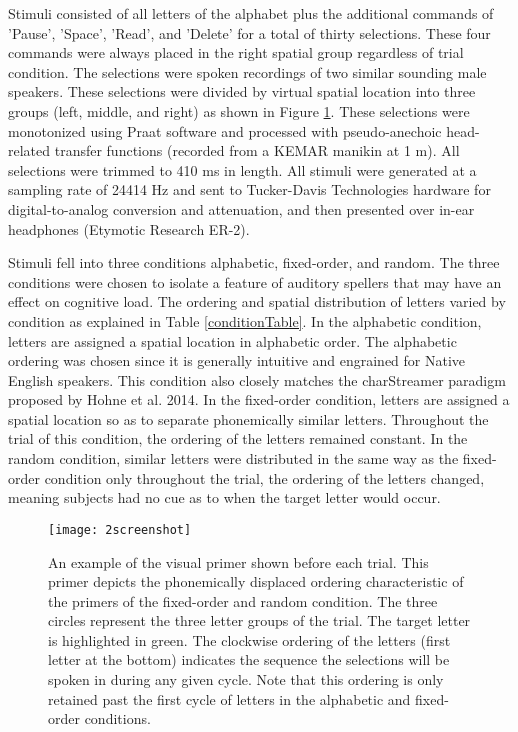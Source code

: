 \documentclass[10pt]{article}
\begin{document}
Stimuli consisted of all letters of the alphabet plus the
additional commands of 'Pause', 'Space', 'Read', and 'Delete'
for a total of thirty selections.  These four commands were
always placed in the right spatial group regardless of trial
condition.  The selections were spoken recordings of two
similar sounding male speakers.  These selections were divided
by virtual spatial location into three groups (left, middle,
and right) as shown in Figure \ref{screenshot}.  These
selections were monotonized using Praat software and processed
with pseudo-anechoic head-related transfer functions (recorded
from a KEMAR manikin at 1 m).  All selections were trimmed to
410 ms in length.  All stimuli were generated at a
sampling rate of 24414 Hz and sent to Tucker-Davis
Technologies hardware for digital-to-analog conversion and
attenuation, and then presented over in-ear headphones
(Etymotic Research ER-2).

Stimuli fell into three conditions alphabetic, fixed-order,
and random.  The three conditions were chosen to isolate a
feature of auditory spellers that may have an effect on
cognitive load.  The ordering and spatial distribution of
letters varied by condition as explained in Table
\ref{conditionTable}.  In the alphabetic condition, letters
are assigned a spatial location in alphabetic order.  The
alphabetic ordering was chosen since it is generally intuitive
and engrained for Native English speakers.  This condition
also closely matches the charStreamer paradigm proposed by
Hohne et al.  2014\cite{Hohne2014}.  In the fixed-order
condition, letters are assigned a spatial location so as to
separate phonemically similar letters.  Throughout the trial
of this condition, the ordering of the letters remained
constant.  In the random condition, similar letters were
distributed in the same way as the fixed-order condition only
throughout the trial, the ordering of the letters changed,
meaning subjects had no cue as to when the target letter would
occur. 

\begin{figure}[t]
  \centering
  \texttt{[image: 2screenshot]}
  \caption{ An example of the visual primer shown before each
      trial.  This primer depicts the phonemically displaced
      ordering characteristic of the primers of the
      fixed-order and random condition. The three circles
      represent the three letter groups of the trial.  The
      target letter is highlighted in green.  The clockwise
      ordering of the letters (first letter at the bottom)
      indicates the sequence the selections will be spoken in
  during any given cycle.  Note that this ordering is only
  retained past the first cycle of letters in the alphabetic
  and fixed-order conditions.}
  \label{screenshot}
\end{figure}
\end{document}

